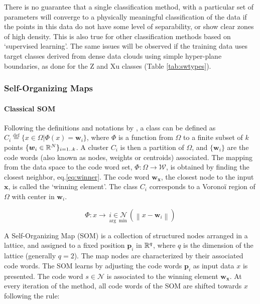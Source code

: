 There is no guarantee that a single classification method, with a particular set of parameters will converge to a physically meaningful classification of the data if the points in this data do not have some level of separability, or show clear zones of high density. This is also true for other classification methods based on `supervised learning'. The same issues will be observed if the training data uses target classes derived from dense data clouds using simple hyper-plane boundaries, as done for the Z and Xu classes (Table \ref{tab:swtypes}).

\subsubsection{Self-Organizing Maps}

\paragraph{Classical SOM}

Following the definitions and notations by \citep{Villmann2006}, a class can be defined as $C_i\overset{\text{def}}{=} \{x\in\Omega | \Phi(x)=\boldsymbol{w}_i\}$, where $\Phi$ is a function from $\Omega$ to a finite subset of $k$ points $\{\boldsymbol{w}_i\in\Bbb R^N\}_{i=1..k}$. A cluster $C_i$ is then a partition of $\Omega$, and $\{\boldsymbol{w}_i\}$ are the code words (also known as nodes, weights or centroids) associated. The mapping from the data space to the code word set, $\Phi: \Omega\rightarrow\mathcal{W}$, is obtained by finding the closest neighbor, eq.\eqref{eq:winner}. The code word $\boldsymbol{w_x}$, the closest node to the input $\boldsymbol{x}$, is called the `winning element'. The class $C_i$ corresponds to a Vorono\"i region of $\Omega$ with center in $\boldsymbol{w}_i$.

\begin{equation}
\Phi: x \rightarrow  \underset{\arg\min}{i\in\mathcal{N}}\left( \left\lVert x - \boldsymbol{w}_i \right\rVert \right) \label{eq:winner}
\end{equation}

A Self-Organizing Map (SOM) is a collection of structured nodes arranged in a lattice, and assigned to a fixed position $\boldsymbol{p}_i$ in $\Bbb R^q$, where $q$ is the dimension of the lattice (generally $q=2$). The map nodes are characterized by their associated code words. The SOM learns by adjusting the code words $\boldsymbol{p}_i$ as input data $x$ is presented. The code word $s \in \mathcal{N}$ is associated to the winning element $\boldsymbol{w_x}$. At every iteration of the method, all code words of the SOM are shifted towards $x$ following the rule:

